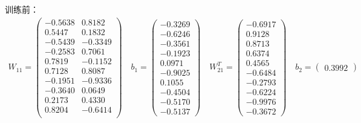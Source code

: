 \documentclass[UTF8]{article}
\begin{document}
训练前：
\begin{equation}
\nonumber
\begin{aligned}
    W_{11} = 
    \left(
    \begin{matrix}
        -0.5638 &  0.8182\\
        0.5447 &  0.1832\\
        -0.5439 & -0.3349\\
        -0.2583 &  0.7061\\
        0.7819 & -0.1152\\
        0.7128  & 0.8087\\
        -0.1951 & -0.9336\\
        -0.3640 &  0.0649\\
        0.2173 & 0.4330\\
        0.8204 & -0.6414\\
    \end{matrix}
    \right)
    \quad
    b_{1} = 
    \left(
    \begin{matrix}
        -0.3269\\
        -0.6246\\
        -0.3561\\
        -0.1923\\
            0.0971\\
        -0.9025\\
            0.1055\\
        -0.4504\\
        -0.5170\\
        -0.5137
    \end{matrix}
    \right)
    \quad
    W_{21}^T = 
    \left(
    \begin{matrix}
        -0.6917 \\  0.9128\\ 0.8713\\  0.6374\\ 0.4565\\ -0.6484\\-0.2793\\-0.6224 \\-0.9976 \\-0.3672
    \end{matrix}
    \right)
    \quad
    b_{2} = 
    \left(
    \begin{matrix}
        0.3992
    \end{matrix}
    \right)
\end{aligned}
\end{equation}
\end{document}
